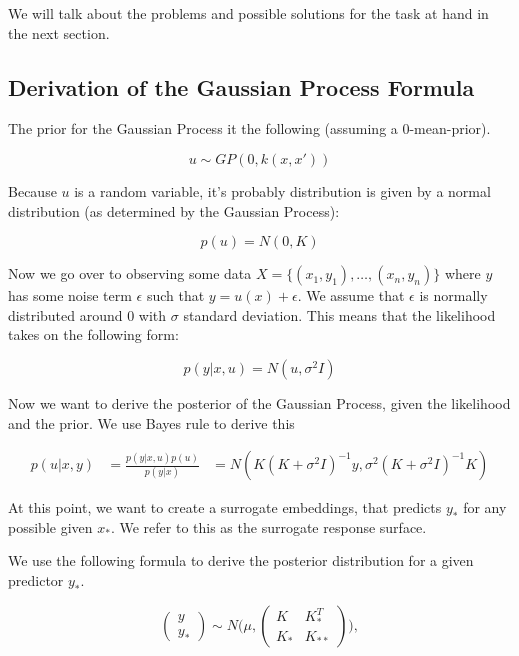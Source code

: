 We will talk about the problems and possible solutions for the task at hand in the next section.

\subsection{Derivation of the Gaussian Process Formula}
The prior for the Gaussian Process it the following (assuming a 0-mean-prior).

\begin{equation}
u \sim GP(0, k(x, x'))
\end{equation}

Because $u$ is a random variable, it's probably distribution is given by a normal distribution (as determined by the Gaussian Process):

\begin{equation}
p(u) = N ( 0, K )
\end{equation}

Now we go over to observing some data $ X = \{ (x_1, y_1), \ldots, (x_n, y_n) \} $ where $y$ has some noise term $\epsilon$ such that $y = u(x) + \epsilon$.
We assume that $\epsilon$ is normally distributed around $0$ with $\sigma$ standard deviation.
This means that the likelihood takes on the following form:

\begin{equation}
p(y | x, u) = N (u, \sigma^2 I)
\end{equation}


Now we want to derive the posterior of the Gaussian Process, given the likelihood and the prior.
We use Bayes rule to derive this

\begin{align}
p(u | x, y) &= \frac{ p(y | x, u) p(u) }{p(y | x)}
& = N( K(K +\sigma^2 I)^{-1}y, \sigma^2 (K + \sigma^2 I)^{-1} K )
\end{align}

At this point, we want to create a surrogate embeddings, that predicts $y_*$ for any possible given $x_*$. 
We refer to this as the surrogate response surface.

We use the following formula to derive the posterior distribution for a given predictor $y_*$.

\begin{equation}
\begin{pmatrix} y \\
y_* \end{pmatrix} \sim N\Biggl(\mu,\begin{pmatrix} K & K^T_*\\
 K_* & K_{**} \end{pmatrix}\Biggr),
\end{equation}

